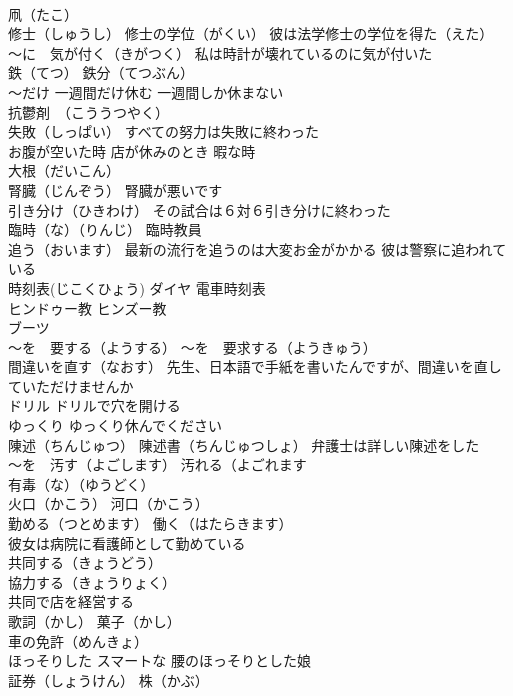 \documentclass[8pt]{extreport}
\begin{document}
\begin{CJK}{UTF8}{min}
\\	凧（たこ）
\\	修士（しゅうし） 修士の学位（がくい） 彼は法学修士の学位を得た（えた）
\\	～に　気が付く（きがつく） 私は時計が壊れているのに気が付いた
\\	鉄（てつ） 鉄分（てつぶん）
\\	～だけ 一週間だけ休む 一週間しか休まない
\\	抗鬱剤　（こううつやく）
\\	失敗（しっぱい） すべての努力は失敗に終わった
\\	お腹が空いた時 店が休みのとき 暇な時
\\	大根（だいこん）
\\	腎臓（じんぞう） 腎臓が悪いです
\\	引き分け（ひきわけ） その試合は６対６引き分けに終わった
\\	臨時（な）（りんじ） 臨時教員
\\	追う（おいます） 最新の流行を追うのは大変お金がかかる 彼は警察に追われている
\\	時刻表(じこくひょう) ダイヤ 電車時刻表
\\	ヒンドゥー教 ヒンズー教 
\\	ブーツ
\\	～を　要する（ようする） ～を　要求する（ようきゅう）
\\	間違いを直す（なおす） 先生、日本語で手紙を書いたんですが、間違いを直していただけませんか
\\	ドリル ドリルで穴を開ける
\\	ゆっくり ゆっくり休んでください
\\	陳述（ちんじゅつ） 陳述書（ちんじゅつしょ） 弁護士は詳しい陳述をした
\\	～を　汚す（よごします） 汚れる（よごれます
\\	有毒（な）（ゆうどく）
\\	火口（かこう） 河口（かこう）
\\	勤める（つとめます） 働く（はたらきます）
\\	彼女は病院に看護師として勤めている
\\	共同する（きょうどう）
\\	協力する（きょうりょく）
\\	共同で店を経営する
\\	歌詞（かし） 菓子（かし）
\\	車の免許（めんきょ）
\\	ほっそりした スマートな 腰のほっそりとした娘
\\	証券（しょうけん） 株（かぶ） 

\end{CJK}
\end{document}
